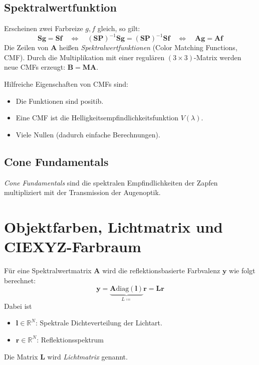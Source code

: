 \documentclass[a4paper, 11pt, accentcolor = tud3b]{tudreport}
\newcommand{\R}{\mathbb{R}}
\newcommand{\mat}[1]{\boldsymbol{#1}}
\renewcommand{\vec}[1]{\boldsymbol{\mathbf{#1}}}
\begin{document}
			\subsection{Spektralwertfunktion}
				Erscheinen zwei Farbreize \( g, f \) gleich, so gilt:
				\begin{equation*}
					\mat{S} \vec{g} = \mat{S} \vec{f} \quad\iff\quad (\mat{S}\mat{P})^{-1} \mat{S} \vec{g} = (\mat{S} \mat{P})^{-1} \mat{S} \vec{f} \quad\iff\quad \mat{A} \vec{g} = \mat{A} \vec{f}
				\end{equation*}
				Die Zeilen von \( \mat{A} \) heißen \emph{Spektralwertfunktionen} (Color Matching Functions, CMF). Durch die Multiplikation mit einer regulären \( (3 \times 3) \)-Matrix werden neue CMFs erzeugt: \( \mat{B} = \mat{M} \mat{A} \).
				
				Hilfreiche Eigenschaften von CMFs sind:
				\begin{itemize}
					\item Die Funktionen sind positib.
					\item Eine CMF ist die Helligkeitsempfindlichkeitsfunktion \( V(\lambda) \).
					\item Viele Nullen (dadurch einfache Berechnungen).
				\end{itemize}

			\subsection{Cone Fundamentals}
				\emph{Cone Fundamentals} sind die spektralen Empfindlichkeiten der Zapfen multipliziert mit der Transmission der Augenoptik.

		\section{Objektfarben, Lichtmatrix und CIEXYZ-Farbraum}
			Für eine Spektralwertmatrix \( \mat{A} \) wird die reflektionsbasierte Farbvalenz \( \vec{y} \) wie folgt berechnet:
			\begin{equation*}
				\vec{y} = \underbrace{\mat{A} \text{diag}(\vec{l})}_{L \coloneqq} \vec{r} = \mat{L} \vec{r}
			\end{equation*}
			Dabei ist
			\begin{itemize}
				\item \( \vec{l} \in \R^N \): Spektrale Dichteverteilung der Lichtart.
				\item \( \vec{r} \in \R^N \): Reflektionsspektrum
			\end{itemize}
			Die Matrix \( \mat{L} \) wird \emph{Lichtmatrix} genannt.
			
\end{document}
